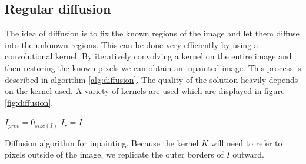 \subsection{Regular diffusion}
The idea of diffusion is to fix the known regions of the image and let them diffuse into the unknown regions. This can be done very efficiently by using a convolutional kernel. By iteratively convolving a kernel on the entire image and then restoring the known pixels we can obtain an inpainted image. This process is described in algorithm \ref{alg:diffusion}. The quality of the solution heavily depends on the kernel used. A variety of kernels are used which are displayed in figure \ref{fig:diffusion}.

\begin{algorithm}
	$I_{prev} = 0_{size(I)}$\;
	$I_{r} = I$\;
	\quad
\caption{Diffusion algorithm for inpainting. Because the kernel $K$ will need to refer to pixels outside of the image, we replicate the outer borders of $I$ outward.}
\label{alg:diffusion}
\end{algorithm}